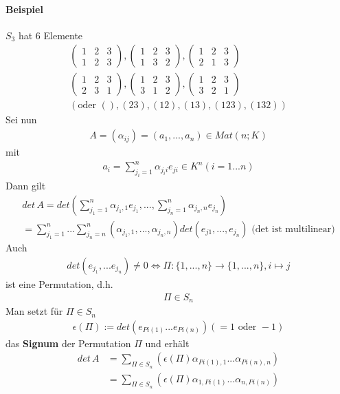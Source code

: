 \documentclass[11pt]{report}
\newcommand*\f[1] {\textbf{#1}}
\begin{document}
\paragraph{Beispiel}
$S_3$ hat 6 Elemente
\begin{align}
\begin{pmatrix} 1 & 2 & 3 \\ 1 & 2 & 3 \end{pmatrix}, \begin{pmatrix} 1 & 2 & 3 \\ 1 & 3 & 2 \end{pmatrix}, \begin{pmatrix} 1 & 2 & 3 \\ 2 & 1 & 3 \end{pmatrix} \\
\begin{pmatrix} 1 & 2 & 3 \\ 2 & 3 & 1 \end{pmatrix}, \begin{pmatrix} 1 & 2 & 3 \\ 3 & 1 & 2 \end{pmatrix}, \begin{pmatrix} 1 & 2 & 3 \\ 3 & 2 & 1 \end{pmatrix} \\
(\text{oder } (), (2 3), (1 2), (1 3), (1 2 3), (1 3 2))
\end{align}
Sei nun
\begin{align}
A = (\alpha_{ij}) = (a_1, ..., a_n) \in Mat(n;K)
\end{align}
mit
\begin{align}
a_i= \sum_{j_i = 1}^{n} \alpha_{j_i i} e_{ji} \in K^n (i = 1...n)
\end{align}
Dann gilt
\begin{align}
det \, A = det \left( \sum_{j_1 = 1}^{n} \alpha_{j_1, 1} e_{j_1}, ...,  \sum_{j_n = 1}^{n} \alpha_{j_n, n} e_{j_n}\right) \\
= \sum_{j_1 = 1}^{n} ... \sum_{j_n = n}^{n} (\alpha_{j_1, 1}, ..., \alpha_{j_n, n}) det(e_{j1}, ..., e_{j_n}) \text{ (det ist multilinear)}
\end{align}
Auch
\begin{align}
det(e_{j_1}, ... e_{j_n}) \neq 0  \Leftrightarrow \Pi: \{1, ..., n\} \rightarrow \{1, ..., n\}, i \mapsto j
\end{align}
ist eine Permutation, d.h.
\begin{align}
\Pi \in S_n
\end{align}
Man setzt für $\Pi \in S_n$
\begin{align}
\epsilon(\Pi) := det(e_{Pi(1)} ... e_{Pi(n)}) (=1 \text{ oder } -1)
\end{align}
das \f{Signum} der Permutation $\Pi$ und erhält
\begin{align}
det \, A &= \sum_{\Pi \in S_n} (\epsilon(\Pi) \alpha_{Pi(1), 1}... \alpha_{Pi(n), n}) \\
&= \sum_{\Pi \in S_n} (\epsilon(\Pi) \alpha_{1, Pi(1)}... \alpha_{n, Pi(n)})
\end{align}
\end{document}
